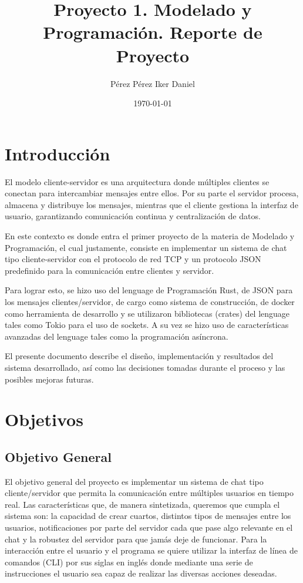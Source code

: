 \documentclass[12pt]{article}
\title{Proyecto 1. Modelado y Programación. Reporte de Proyecto}
\author{Pérez Pérez Iker Daniel}
\date{\today}
\begin{document}
\maketitle
\thispagestyle{empty}

\newpage
\tableofcontents
\newpage

\section{Introducción}

El modelo cliente-servidor es una arquitectura donde múltiples clientes se conectan para intercambiar mensajes entre ellos. Por su parte el servidor procesa, almacena y distribuye los mensajes, mientras que el cliente gestiona la interfaz de usuario, garantizando comunicación continua y centralización de datos.

En este contexto es donde entra el primer proyecto de la materia de Modelado y Programación, el cual justamente, consiste en implementar un sistema de chat tipo cliente-servidor con el protocolo de red TCP y un protocolo JSON predefinido para la comunicación entre clientes y servidor.

Para lograr esto, se hizo uso del lenguage de Programación Rust, de JSON para los mensajes clientes/servidor, de cargo como sistema de construcción, de docker como herramienta de desarrollo y se utilizaron bibliotecas (crates) del lenguage tales como Tokio para el uso de sockets. A su vez se hizo uso de características avanzadas del lenguage tales como la programación asíncrona.

El presente documento describe el diseño, implementación y resultados del sistema desarrollado, así como las decisiones tomadas durante el proceso y las posibles mejoras futuras.


\section{Objetivos}

\subsection{Objetivo General}
El objetivo general del proyecto es implementar un sistema de chat tipo cliente/servidor que permita la comunicación entre múltiples usuarios en tiempo real. Las características que, de manera sintetizada, queremos que cumpla el sistema son: la capacidad de crear cuartos, distintos tipos de mensajes entre los usuarios, notificaciones por parte del servidor cada que pase algo relevante en el chat y la robustez del servidor para que jamás deje de funcionar. Para la interacción entre el usuario y el programa se quiere utilizar la interfaz de línea de comandos (CLI) por sus siglas en inglés donde mediante una serie de instrucciones el usuario sea capaz de realizar las diversas acciones deseadas.
\end{document}
